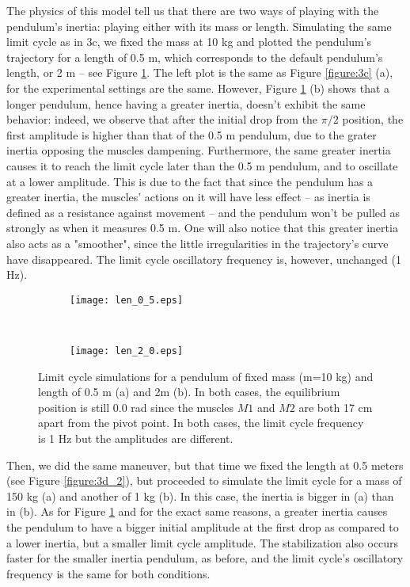 \documentclass{cmc}
\begin{document}
The physics of this model tell us that there are two ways of playing with the pendulum's inertia: playing either with its mass or length. Simulating the same limit cycle as in 3c, we fixed the mass at 10 kg and plotted the pendulum's trajectory for a length of 0.5 m, which corresponds to the default pendulum's length, or 2 m -- see Figure \ref{figure:3d_1}. The left plot is the same as Figure \ref{figure:3c} (a), for the experimental settings are the same. However, Figure \ref{figure:3d_1} (b) shows that a longer pendulum, hence having a greater inertia, doesn't exhibit the same behavior: indeed, we observe that after the initial drop from the $\pi/2$ position, the first amplitude is higher than that of the 0.5 m pendulum, due to the grater inertia opposing the muscles dampening. Furthermore, the same greater inertia causes it to reach the limit cycle later than the 0.5 m pendulum, and to oscillate at a lower amplitude. This is due to the fact that since the pendulum has a greater inertia, the muscles' actions on it will have less effect -- as inertia is defined as a resistance against movement -- and the pendulum won't be pulled as strongly as when it measures 0.5 m. One will also notice that this greater inertia also acts as a "smoother", since the little irregularities in the trajectory's curve have disappeared. The limit cycle oscillatory frequency is, however, unchanged (1 Hz).  


\begin{figure}[ht!]
    \centering
    \begin{subfigure}[t]{0.5\textwidth}
        \centering
        \texttt{[image: len\_0\_5.eps]}
        \caption{}
    \end{subfigure}%
    ~ 
    \begin{subfigure}[t]{0.5\textwidth}
        \centering
        \texttt{[image: len\_2\_0.eps]}
        \caption{}
    \end{subfigure}
    \caption{ Limit cycle simulations for a pendulum of fixed mass (m=10 kg) and length of 0.5 m (a) and 2m (b). In both cases, the equilibrium position is still 0.0 rad since the muscles $M1$ and $M2$ are both 17 cm apart from the pivot point. In both cases, the limit cycle frequency is 1 Hz but the amplitudes are different.}
    \label{figure:3d_1}
\end{figure}

Then, we did the same maneuver, but that time we fixed the length at 0.5 meters (see Figure \ref{figure:3d_2}), but proceeded to simulate the limit cycle for a mass of 150 kg (a) and another of 1 kg (b). In this case, the inertia is bigger in (a) than in (b). As for Figure \ref{figure:3d_1} and for the exact same reasons, a greater inertia causes the pendulum to have a bigger initial amplitude at the first drop as compared to a lower inertia, but a smaller limit cycle amplitude. The stabilization also occurs faster for the smaller inertia pendulum, as before, and the limit cycle's oscillatory frequency is the same for both conditions.
\end{document}
